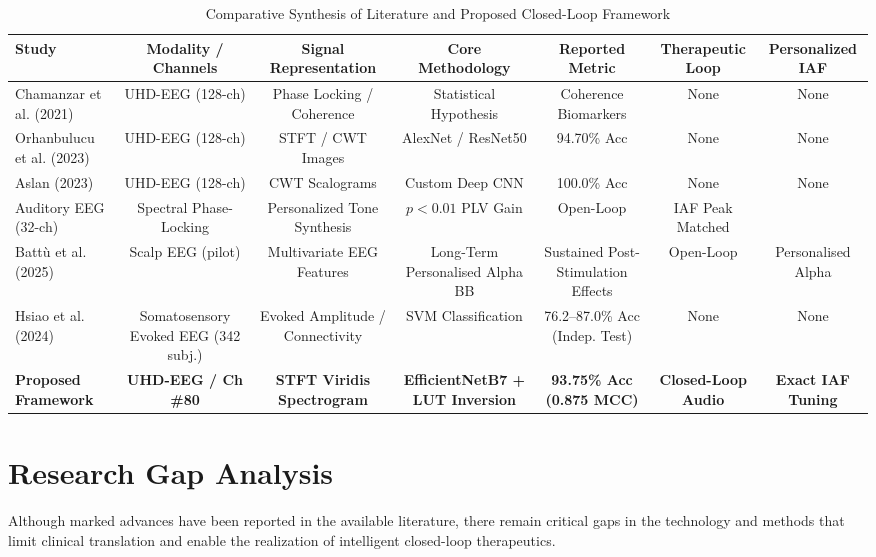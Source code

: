\documentclass[12pt, a4paper]{report}
\begin{document}
\begin{table}[htbp]
\centering
\caption{Comparative Synthesis of Literature and Proposed Closed-Loop Framework}
\label{tab:lit_comparison}
\begin{adjustbox}{width=0.98\textwidth}
\begin{tabular}{lcccccc}
\toprule
\textbf{Study} & \textbf{Modality / Channels} & \textbf{Signal Representation} & \textbf{Core Methodology} & \textbf{Reported Metric} & \textbf{Therapeutic Loop} & \textbf{Personalized IAF} \\
\midrule
Chamanzar et al. (2021) \cite{chamanzar2021uhd} & UHD-EEG (128-ch) & Phase Locking / Coherence & Statistical Hypothesis & Coherence Biomarkers & None & None \\
Orhanbulucu et al. (2023) \cite{orhanbulucu2023hybrid} & UHD-EEG (128-ch) & STFT / CWT Images & AlexNet / ResNet50 & 94.70\% Acc & None & None \\
Aslan (2023) \cite{aslan2023migrainecnn} & UHD-EEG (128-ch) & CWT Scalograms & Custom Deep CNN & 100.0\% Acc & None & None \\
Auditory EEG (32-ch) & Spectral Phase-Locking & Personalized Tone Synthesis & $p < 0.01$ PLV Gain & Open-Loop & IAF Peak Matched \\
Batt\`u et al. (2025) \cite{battu2025longterm} & Scalp EEG (pilot) & Multivariate EEG Features & Long-Term Personalised Alpha BB & Sustained Post-Stimulation Effects & Open-Loop & Personalised Alpha \\
Hsiao et al. (2024) \cite{hsiao2024brainstem} & Somatosensory Evoked EEG (342 subj.) & Evoked Amplitude / Connectivity & SVM Classification & 76.2--87.0\% Acc (Indep. Test) & None & None \\
\textbf{Proposed Framework} & \textbf{UHD-EEG / Ch \#80} & \textbf{STFT Viridis Spectrogram} & \textbf{EfficientNetB7 + LUT Inversion} & \textbf{93.75\% Acc (0.875 MCC)} & \textbf{Closed-Loop Audio} & \textbf{Exact IAF Tuning} \\
\bottomrule
\end{tabular}
\end{adjustbox}
\end{table}

\section{Research Gap Analysis}
\label{sec:gap_analysis}
Although marked advances have been reported in the available literature, there remain critical gaps in the technology and methods that limit clinical translation and enable the realization of intelligent closed-loop therapeutics.
\end{document}
